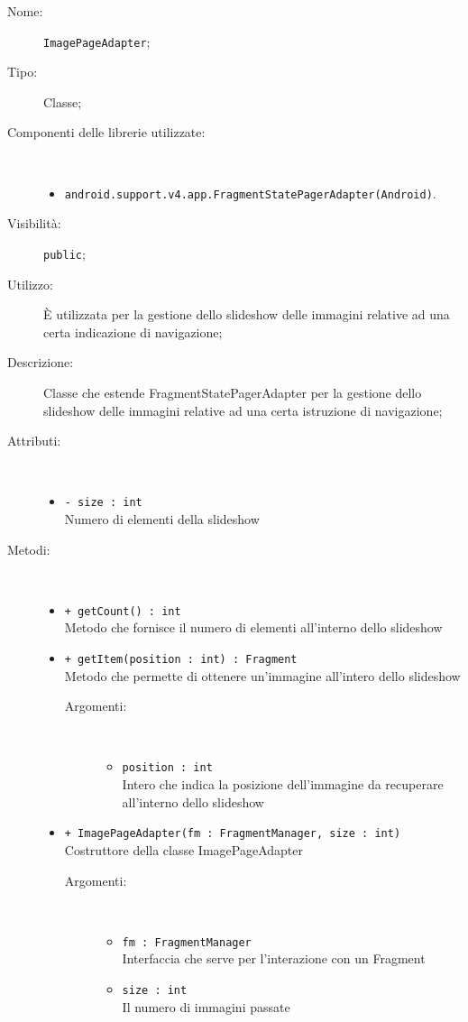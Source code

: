\documentclass[../DefinizioneDiProdotto.tex]{subfiles}
\begin{document}
    \begin{description}
\item[Nome:] \texttt{ImagePageAdapter};
\item[Tipo:] Classe;
\item[Componenti delle librerie utilizzate:] \
\begin{itemize}
\item \texttt{android.support.v4.app.FragmentStatePagerAdapter(Android)}.

\end{itemize}
\item[Visibilità:] \texttt{public};
\item[Utilizzo:] È utilizzata per la gestione dello slideshow delle immagini relative ad una certa indicazione di navigazione;
\item[Descrizione:] Classe che estende FragmentStatePagerAdapter per la gestione dello slideshow delle immagini relative ad una certa istruzione di navigazione;
\item[Attributi:] \
\begin{itemize}
\item \texttt{- size : int}\\
Numero di elementi della slideshow

\end{itemize}
\item[Metodi:] \
\begin{itemize}
\item \texttt{+ getCount() : int}\\
Metodo che fornisce il numero di elementi all'interno dello slideshow
 \item \texttt{+ getItem(position : int) : Fragment}\\
Metodo che permette di ottenere un'immagine all'intero dello slideshow
 \begin{description}
\item[Argomenti:] \
\begin{itemize}
\item \texttt{position : int}\\
Intero che indica la posizione dell'immagine da recuperare all'interno dello slideshow\end{itemize}
\end{description}
\item \texttt{+ ImagePageAdapter(fm : FragmentManager, size : int)}\\
Costruttore della classe ImagePageAdapter
 \begin{description}
\item[Argomenti:] \
\begin{itemize}
\item \texttt{fm : FragmentManager}\\
Interfaccia che serve per l'interazione con un Fragment 
\item \texttt{size : int}\\
Il numero di immagini passate
\end{itemize}
\end{description}
\end{itemize}
\end{description}
\end{document}
